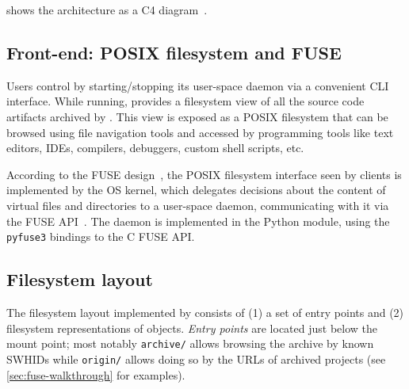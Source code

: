  shows the \SWHFS{} architecture as a C4
diagram~\cite{brown2018c4}.

\subsection{Front-end: POSIX filesystem and FUSE}

Users control \SWHFS{} by starting/stopping its user-space daemon via a
convenient CLI interface. While running, \SWHFS{} provides a filesystem view of
all the source code artifacts archived by \SWH{}. This view is exposed as a
POSIX filesystem that can be browsed using file navigation tools and accessed
by programming tools like text editors, IDEs, compilers, debuggers, custom
shell scripts, etc.

According to the FUSE design~\cite{vangoor2017fuseperf}, the POSIX filesystem
interface seen by \SWHFS{} clients is implemented by the OS kernel, which
delegates decisions about the content of virtual files and directories to a
user-space daemon, communicating with it via the FUSE API~\cite{fuse}. The
\SWHFS{} daemon is implemented in the \SWHFSpy{} Python module, using the
\texttt{pyfuse3}
bindings to the C FUSE API\@.

\subsection{Filesystem layout}

The filesystem layout implemented by \SWHFSpy{} consists of (1) a set of entry
points and (2) filesystem representations of \SWH{} objects. \emph{Entry points}
are located just below the \SWHFS{} mount point; most notably \texttt{archive/}
allows browsing the \SWH{} archive by known SWHIDs while \texttt{origin/} allows
doing so by the URLs of archived projects (see \cref{sec:fuse-walkthrough}
for examples).


